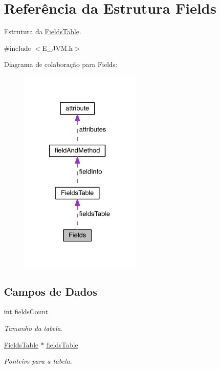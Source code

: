 \hypertarget{struct_fields}{}\section{Referência da Estrutura Fields}
\label{struct_fields}


Estrutura da \hyperlink{struct_fields_table}{Fields\+Table}.  




{\ttfamily \#include $<$E\+\_\+\+J\+V\+M.\+h$>$}



Diagrama de colaboração para Fields\+:\nopagebreak
\begin{figure}[H]
\begin{center}
\leavevmode
\includegraphics[width=173pt]{struct_fields__coll__graph}
\end{center}
\end{figure}
\subsection*{Campos de Dados}
\begin{DoxyCompactItemize}
\item 
int \hyperlink{struct_fields_a48a4d89fd6f0f586e7b34265f1bacc67}{fields\+Count}
\begin{DoxyCompactList}\small\item\em Tamanho da tabela. \end{DoxyCompactList}\item 
\hyperlink{struct_fields_table}{Fields\+Table} $\ast$ \hyperlink{struct_fields_a6ec79b0bb356e60d228bce5980680779}{fields\+Table}
\begin{DoxyCompactList}\small\item\em Ponteiro para a tabela. \end{DoxyCompactList}\end{DoxyCompactItemize}


